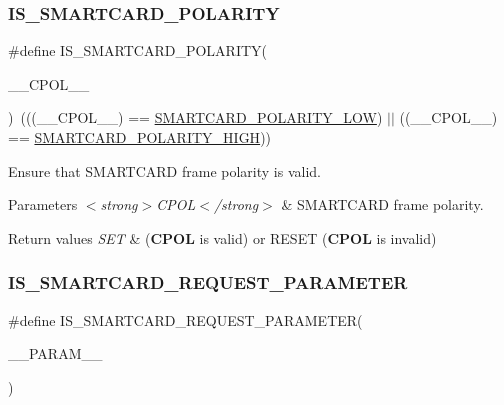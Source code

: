 \subsubsection{\texorpdfstring{I\+S\+\_\+\+S\+M\+A\+R\+T\+C\+A\+R\+D\+\_\+\+P\+O\+L\+A\+R\+I\+TY}{IS\_SMARTCARD\_POLARITY}}
{\footnotesize\ttfamily \#define I\+S\+\_\+\+S\+M\+A\+R\+T\+C\+A\+R\+D\+\_\+\+P\+O\+L\+A\+R\+I\+TY(\begin{DoxyParamCaption}\item[{}]{\+\_\+\+\_\+\+C\+P\+O\+L\+\_\+\+\_\+ }\end{DoxyParamCaption})~(((\+\_\+\+\_\+\+C\+P\+O\+L\+\_\+\+\_\+) == \hyperlink{group___s_m_a_r_t_c_a_r_d___clock___polarity_ga07e246426d125fbc19f8e363f09b21e5}{S\+M\+A\+R\+T\+C\+A\+R\+D\+\_\+\+P\+O\+L\+A\+R\+I\+T\+Y\+\_\+\+L\+OW}) $\vert$$\vert$ ((\+\_\+\+\_\+\+C\+P\+O\+L\+\_\+\+\_\+) == \hyperlink{group___s_m_a_r_t_c_a_r_d___clock___polarity_ga69e81ca7759a40f9e13c4051fe44a95f}{S\+M\+A\+R\+T\+C\+A\+R\+D\+\_\+\+P\+O\+L\+A\+R\+I\+T\+Y\+\_\+\+H\+I\+GH}))}



Ensure that S\+M\+A\+R\+T\+C\+A\+RD frame polarity is valid. 


\begin{DoxyParams}{Parameters}
{\em $<$strong$>$\+C\+P\+O\+L$<$/strong$>$} & S\+M\+A\+R\+T\+C\+A\+RD frame polarity. \\
\hline
\end{DoxyParams}

\begin{DoxyRetVals}{Return values}
{\em S\+ET} & ({\bfseries C\+P\+OL} is valid) or R\+E\+S\+ET ({\bfseries C\+P\+OL} is invalid) \\
\hline
\end{DoxyRetVals}
\mbox{\label{group___s_m_a_r_t_c_a_r_d___private___macros_ga12cdbfdd69fa9fcb48175ed2196b27e0}} 
\subsubsection{\texorpdfstring{I\+S\+\_\+\+S\+M\+A\+R\+T\+C\+A\+R\+D\+\_\+\+R\+E\+Q\+U\+E\+S\+T\+\_\+\+P\+A\+R\+A\+M\+E\+T\+ER}{IS\_SMARTCARD\_REQUEST\_PARAMETER}}
{\footnotesize\ttfamily \#define I\+S\+\_\+\+S\+M\+A\+R\+T\+C\+A\+R\+D\+\_\+\+R\+E\+Q\+U\+E\+S\+T\+\_\+\+P\+A\+R\+A\+M\+E\+T\+ER(\begin{DoxyParamCaption}\item[{}]{\+\_\+\+\_\+\+P\+A\+R\+A\+M\+\_\+\+\_\+ }\end{DoxyParamCaption})}

